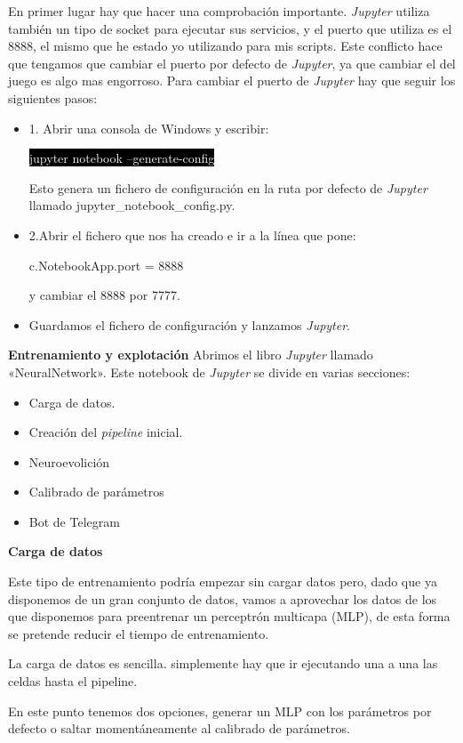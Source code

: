 En primer lugar hay que hacer una comprobación importante. \emph{Jupyter} utiliza también un tipo de socket para ejecutar sus servicios, y el puerto que utiliza es el 8888, el mismo que he estado yo utilizando para mis scripts. Este conflicto hace que tengamos que cambiar el puerto por defecto de \emph{Jupyter}, ya que cambiar el del juego es algo mas engorroso. Para cambiar el puerto de \emph{Jupyter} hay que seguir los siguientes pasos:
\begin{itemize}
    \item 1. Abrir una consola de Windows y escribir:
    
    \colorbox{black}{\textcolor{white}{jupyter notebook --generate-config}}
    
    Esto genera un fichero de configuración en la ruta por defecto de \emph{Jupyter} llamado jupyter\_notebook\_config.py.
    \item 2.Abrir el fichero que nos ha creado e ir a la línea que pone: 
    
    c.NotebookApp.port = 8888
    
    y cambiar el 8888 por 7777.
    \item Guardamos el fichero de configuración y lanzamos \emph{Jupyter}.
\end{itemize}

\textbf{Entrenamiento y explotación}
Abrimos el libro \emph{Jupyter} llamado «NeuralNetwork». Este notebook de \emph{Jupyter} se divide en varias secciones:
\begin{itemize}
    \item Carga de datos.
    \item Creación del \emph{pipeline} inicial.
    \item Neuroevolición
    \item Calibrado de parámetros
    \item Bot de Telegram
\end{itemize}

\textbf{Carga de datos}

Este tipo de entrenamiento podría empezar sin cargar datos pero, dado que ya disponemos de un gran conjunto de datos, vamos a aprovechar los datos de los que disponemos para preentrenar un perceptrón multicapa (MLP), de esta forma se pretende reducir el tiempo de entrenamiento. 

La carga de datos es sencilla. simplemente hay que ir ejecutando una a una las celdas hasta el pipeline.

En este punto tenemos dos opciones, generar un MLP con los parámetros por defecto o saltar momentáneamente al calibrado de parámetros.

